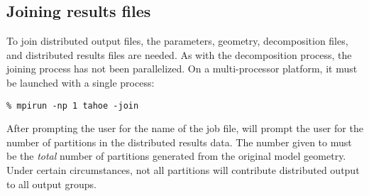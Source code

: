 \subsection{Joining results files}
\label{sect.joining}
To join distributed output files, the parameters, geometry, decomposition
files, and distributed results files are needed.  As with the decomposition
process, the joining process has not been parallelized.  On a
multi-processor platform, it must be launched with a single process:
\begin{center}
\texttt{\% mpirun -np 1 tahoe -join}
\end{center}
After prompting the user for the name of the job file, \tahoe will prompt
the user for the number of partitions in the distributed results data.  The
number given to \tahoe must be the \emph{total} number of partitions generated from
the original model geometry.  Under certain circumstances, not all
partitions will contribute distributed output to all output groups.
